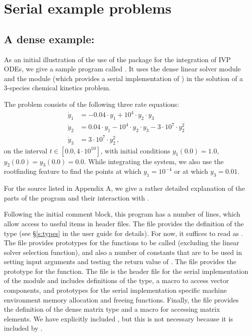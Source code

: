 \section{Serial example problems}\label{s:ex_serial}

\subsection{A dense example: }\label{ss:cvdx}

As an initial illustration of the use of the {\cvode} package for the
integration of IVP ODEs, we give a sample program called .
It uses the {\cvode} dense linear solver module {\cvdense} 
and the {\nvecs} module (which provides a serial implementation of {\nvector})
in the solution of a 3-species chemical kinetics problem.

The problem consists of the following three rate equations:
\begin{equation}
  \begin{split}
    {\dot y}_1 &= -0.04 \cdot y_1 + 10^4 \cdot y_2 \cdot y_3 \\
    {\dot y}_2 &=  0.04 \cdot y_1 - 10^4 \cdot y_2 \cdot y_3 - 3 \cdot 10^7 \cdot y_2^2 \\
    {\dot y}_3 &=  3 \cdot 10^7 \cdot y_2^2 \, ,
  \end{split} 
\end{equation}
on the interval $t \in [0.0, 4 \cdot 10^{10}]$, with initial conditions
$y_1(0.0) = 1.0$, $y_2(0.0) = y_3(0.0) = 0.0$.
While integrating the system, we also use the rootfinding
feature to find the points at which $y_1 = 10^{-4}$ or at which
$y_3 = 0.01$.

For the source listed in Appendix A, we give a rather detailed explanation
of the parts of the program and their interaction with {\cvode}.

Following the initial comment block, this program has a number
of  lines, which allow access to useful items in {\cvode}
header files.  The  file provides the definition of the
type  (see \S\ref{s:types} in the user guide for
details).  For now, it suffices to read  as .
The  file provides prototypes for the {\cvode}
functions to be called (excluding the linear solver selection
function), and also a number of constants that are to be used in
setting input arguments and testing the return value of .
The  file provides the prototype for the  function.
The  file is the header file for the serial
implementation of the {\nvector} module and includes definitions of the 
 type, a macro to access vector components, and prototypes 
for the serial implementation specific machine environment memory allocation
and freeing functions.
Finally, the  file provides the definition of the dense
matrix type  and a macro for accessing matrix elements.
We have explicitly included , but this is not necessary because 
it is included by .

